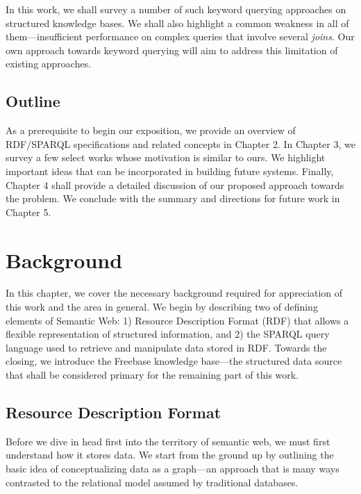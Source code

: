\documentclass[a4paper, twoside, 12pt]{report}
\begin{document}
In this work, we shall survey a number of such keyword querying approaches on structured knowledge bases. We shall also highlight a common weakness in all of them---insufficient performance on complex queries that involve several \emph{joins}. Our own approach towards keyword querying will aim to address this limitation of existing approaches.

\section{Outline}

As a prerequisite to begin our exposition, we provide  an overview of RDF/SPARQL specifications and related concepts in Chapter 2. In Chapter 3, we survey a few select works whose motivation is similar to ours. We highlight important ideas that can be incorporated in building future systems. Finally, Chapter 4 shall provide a detailed discussion of our proposed approach towards the problem. We conclude with the summary and directions for future work in Chapter 5.


\chapter{Background}


In this chapter, we cover the necessary background required for appreciation of this work and the area in general. We begin by describing two of defining elements of Semantic Web: 1) Resource Description Format (RDF) that allows a flexible representation of structured information, and 2) the SPARQL query language used to retrieve and manipulate data stored in RDF. Towards the closing, we introduce the Freebase knowledge base---the structured data source that shall be considered primary for the remaining part of this work.


\section[RDF]{Resource Description Format}

Before we dive in head first into the territory of semantic web, we must first understand how it stores data. We start from the ground up by outlining the basic idea of conceptualizing data as a graph---an approach that is many ways contrasted to the relational model assumed by traditional databases.
\end{document}

